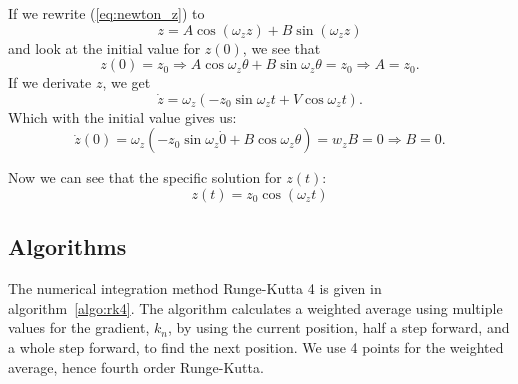 \documentclass[english,notitlepage,reprint,nofootinbib]{revtex4-1}  %
\begin{document}
	If we rewrite (\ref{eq:newton_z}) to 
	\begin{equation*}
		z = A \cos (\omega_z z) + B \sin (\omega_z z)
	\end{equation*}
	and look at the initial value for $z(0)$, we see that
	\begin{equation*}
		z(0) = z_0 \Rightarrow A \cos \omega_z \theta + B \sin \omega_z \theta = z_0 \Rightarrow A = z_0.
	\end{equation*}
	If we derivate $z$, we get 
	\begin{equation*}
		\dot{z} = \omega_z (-z_0 \sin \omega_z t + V \cos \omega_z t).
	\end{equation*}
	Which with the initial value gives us:
	\begin{equation*}
		\dot{z}(0) = \omega_z (- z_0 \sin \omega_z \dot 0 + B \cos \omega_z \theta) = w_z B = 0 \Rightarrow B = 0.
	\end{equation*}
	
	Now we can see that the specific solution for $z(t)$:
	\begin{equation*}
		z(t) = z_0 \cos (\omega_z t)
	\end{equation*}
	
	
\subsection*{Algorithms}
%
The numerical integration method Runge-Kutta 4 is given in algorithm~\ref{algo:rk4}. The algorithm calculates a weighted average using multiple values for the gradient, $k_n$, by using the current position, half a step forward, and a whole step forward, to find the next position. We use 4 points for the weighted average, hence fourth order Runge-Kutta.
\end{document}
